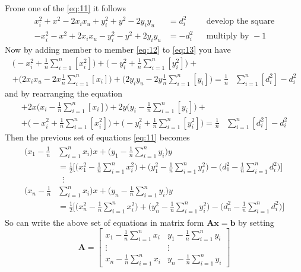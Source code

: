 \documentclass[12pt,twoside]{report}
\begin{document}
Frone one of the \ref{eq:11} it follows
\begin{align}
x_i^2+x^2-2x_ix_u+y_i^2+y^2-2y_iy_u&=d_i^2 &&\text{develop the square}\\ 
-x_i^2-x^2+2x_ix_u-y_i^2-y^2+2y_iy_u&=-d_i^2 && \text{multiply by } -1
\label{eq:13}
\end{align}
Now by adding member to member \ref{eq:12} to \ref{eq:13} you have 
\begin{equation}
\begin{split}
    \bigg(-x_i^2  + \frac{1}{n}\sum_{i=1}^n[x_i^2]\bigg)+
    \bigg(-y_i^2+ \frac{1}{n}\sum_{i=1}^n[y_i^2]\bigg)+\\
    +\bigg(2x_ix_u-2x\frac{1}{n}\sum_{i=1}^n[x_i]\bigg)+
    \bigg(2y_iy_u -2y\frac{1}{n}\sum_{i=1}^n[y_i]\bigg)
    =\frac{1}{n}&\sum_{i=1}^n[d_i^2]-d_i^2
\end{split}    
\end{equation}
and by rearranging the equation
\begin{equation}
\begin{split}
    +2x\bigg(x_i-\frac{1}{n}\sum_{i=1}^n[x_i]\bigg)+
    2y\bigg(y_i -\frac{1}{n}\sum_{i=1}^n[y_i]\bigg)+\\
    +\bigg(-x_i^2  + \frac{1}{n}\sum_{i=1}^n[x_i^2]\bigg)+
    \bigg(-y_i^2+ \frac{1}{n}\sum_{i=1}^n[y_i^2]\bigg)
    =\frac{1}{n}&\sum_{i=1}^n[d_i^2]-d_i^2
\end{split}    
\end{equation}
Then the previous set of equations \ref{eq:11} becomes
\begin{align}
\begin{split} 
    \bigg(x_1-\frac{1}{n}&\sum_{i=1}^nx_i\bigg)x+\bigg(y_1-\frac{1}{n}\sum_{i=1}^ny_i\bigg)y\\
    &=\frac{1}{2}\bigg[\bigg(x_1^2-\frac{1}{n}\sum_{i=1}^nx^2_i\bigg)+\bigg(y_1^2-\frac{1}{n}\sum_{i=1}^ny^2_i\bigg)-\bigg(d_1^2-\frac{1}{n}\sum_{i=1}^nd_i^2\bigg)\bigg]\\
&\;\;\vdots\\
    \bigg(x_n-\frac{1}{n}&\sum_{i=1}^nx_i\bigg)x+\bigg(y_n-\frac{1}{n}\sum_{i=1}^ny_i\bigg)y\\
    &=\frac{1}{2}\bigg[\bigg(x_n^2-\frac{1}{n}\sum_{i=1}^nx^2_i\bigg)+\bigg(y_n^2-\frac{1}{n}\sum_{i=1}^ny^2_i\bigg)-\bigg(d_n^2-\frac{1}{n}\sum_{i=1}^nd_i^2\bigg)\bigg]
\end{split}
\end{align}
So can write the above set of equations in matrix form $\mathbf{Ax}=\mathbf{b}$ by setting
$$
\mathbf{A}=\begin{bmatrix}
    x_1-\frac{1}{n}\sum_{i=1}^nx_i&y_1-\frac{1}{n}\sum_{i=1}^ny_i\\
    \vdots&\vdots\\
    x_n-\frac{1}{n}\sum_{i=1}^nx_i&y_n-\frac{1}{n}\sum_{i=1}^ny_i
\end{bmatrix}
$$
\end{document}
